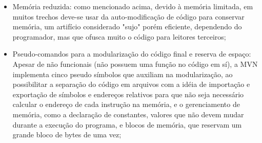 \begin{itemize}
  \item{Memória reduzida: como mencionado acima, devido à memória limitada, em muitos trechos deve-se usar da auto-modificação de código para conservar memória, um artifício considerado "sujo" porém eficiente, dependendo do programador, mas que ofusca muito o código para leitores terceiros;}
  
  \item{Pseudo-comandos para a modularização do código final e reserva de espaço: Apesar de não funcionais (não possuem uma função no código em sí), a MVN implementa cinco pseudo símbolos que auxiliam na modularização, ao possibilitar a separação do código em arquivos com a idéia de importação e exportação de símbolos e endereços relativos para que não seja necessário calcular o endereço de cada instrução na memória, e o gerenciamento de memória, como a declaração de constantes, valores que não devem mudar durante a execução do programa, e blocos de memória, que reservam um grande bloco de bytes de uma vez;}
  
\end{itemize}
